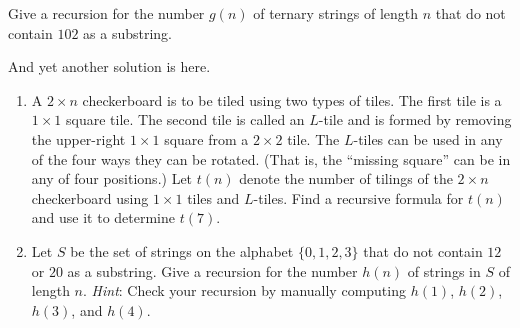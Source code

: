   \begin{exercise}
   Give a recursion for the number $g(n)$ of ternary strings of
    length $n$ that do not contain $102$ as a substring.
    \begin{mysolution}
      And yet another solution is here.
    \end{mysolution}
  \end{exercise}
\begin{enumerate}
\item A $2\times n$ checkerboard is to be tiled using two types of
  tiles. The first tile is a $1\times 1$ square tile. The second tile
  is called an $L$-tile and is formed by removing the upper-right
  $1\times 1$ square from a $2\times 2$ tile. The $L$-tiles can be
  used in any of the four ways they can be rotated. (That is, the
  ``missing square'' can be in any of four positions.) Let $t(n)$
  denote the number of tilings of the $2\times n$ checkerboard using
  $1\times 1$ tiles and $L$-tiles. Find a recursive formula for $t(n)$ and
  use it to determine $t(7)$.
\item Let $S$ be the set of strings on the alphabet $\{0,1,2,3\}$ that
  do not contain $12$ or $20$ as a substring. Give a recursion for the
  number $h(n)$ of strings in $S$ of length $n$. \textit{Hint}: Check
  your recursion by manually computing $h(1)$, $h(2)$, $h(3)$, and
  $h(4)$.


\end{enumerate}
